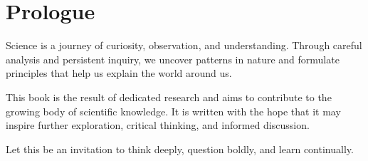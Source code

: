 
\cleardoublepage %
\pagestyle{fancy} %

\chapter*{Prologue}

Science is a journey of curiosity, observation, and understanding. 
Through careful analysis and persistent inquiry, 
we uncover patterns in nature and formulate principles that help us explain the world around us.

This book is the result of dedicated research and aims to contribute to the growing body of scientific knowledge. 
It is written with the hope that it may inspire further exploration, critical thinking, and informed discussion.

Let this be an invitation to think deeply, question boldly, and learn continually.

